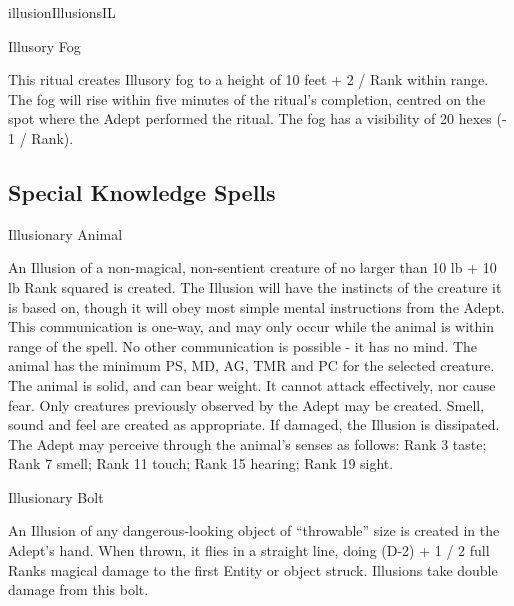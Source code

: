 \begin{college}[1.4]{illusion}{Illusions}{IL}
\begin{ritual}[Q-2]{Illusory Fog}

\begin{effects}
This ritual creates Illusory fog to a height of 10 feet + 2 / Rank
within range. The fog will rise within five minutes of the ritual's
completion, centred on the spot where the Adept performed the
ritual. The fog has a visibility of 20 hexes (- 1 / Rank).
\end{effects}
\end{ritual}

\subsection{Special Knowledge Spells}

\begin{spell}[S-1]{Illusionary Animal}

\begin{effects}
An Illusion of a non-magical, non-sentient creature of no larger than
10 lb + 10 lb \x Rank squared is created. The Illusion will have the
instincts of the creature it is based on, though it will obey most
simple mental instructions from the Adept. This communication is
one-way, and may only occur while the animal is within range of the
spell. No other communication is possible - it has no mind.  The
animal has the minimum PS, MD, AG, TMR and PC for the selected
creature.  The animal is solid, and can bear weight. It cannot attack
effectively, nor cause fear. Only creatures previously observed by the
Adept may be created. Smell, sound and feel are created as
appropriate. If damaged, the Illusion is dissipated. The Adept may
perceive through the animal's senses as follows: Rank 3 taste; Rank 7
smell; Rank 11 touch; Rank 15 hearing; Rank 19 sight.
\end{effects}
\end{spell}

\begin{spell}[S-2]{Illusionary Bolt}

\begin{effects}
An Illusion of any dangerous-looking object of ``throwable'' size is
created in the Adept's hand. When thrown, it flies in a straight line,
doing (D-2) + 1 / 2 full Ranks magical damage to the first Entity or
object struck. Illusions take double damage from this bolt.
\end{effects}
\end{spell}


\end{college}
